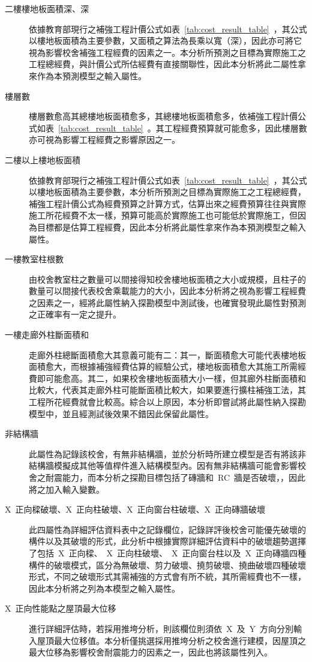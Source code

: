 \begin{description}
  \item[二樓樓地板面積深、深]
  依據教育部現行之補強工程計價公式如表~\ref{tab:cost_result_table}~，其公式以樓地板面積為主要參數，又面積之算法為長乘以寬（深），因此亦可將它視為影響校舍補強工程經費的因素之一。本分析所預測之目標為實際施工之工程總經費，與計價公式所估經費有直接關聯性，因此本分析將此二屬性拿來作為本預測模型之輸入屬性。
  \item[樓層數]
  樓層數愈高其總樓地板面積愈多，其總樓地板面積愈多，依補強工程計價公式如表~\ref{tab:cost_result_table}~。其工程經費預算就可能愈多，因此樓層數亦可視為影響工程經費之影響原因之一。
  \item[二樓以上樓地板面積]
  依據教育部現行之補強工程計價公式如表~\ref{tab:cost_result_table}~，其公式以樓地板面積為主要參數，本分析所預測之目標為實際施工之工程總經費，補強工程計價公式為經費預算之計算方式，估算出來之經費預算往往與實際施工所花經費不太一樣，預算可能高於實際施工也可能低於實際施工，但因為目標都是估算工程經費，因此本分析將此屬性拿來作為本預測模型之輸入屬性。
  \item[一樓教室柱根數]
  由校舍教室柱之數量可以間接得知校舍樓地板面積之大小或規模，且柱子的數量可以間接代表校舍乘載能力的大小，因此本分析將之視為影響工程經費之因素之一，經將此屬性納入探勘模型中測試後，也確實發現此屬性對預測之正確率有一定之提升。
  \item[一樓走廊外柱斷面積和]
  走廊外柱總斷面積愈大其意義可能有二：其一，斷面積愈大可能代表樓地板面積愈大，而根據補強經費估算的經驗公式，樓地板面積愈大其施工所需經費即可能愈高。其二，如果校舍樓地板面積大小一樣，但其廊外柱斷面積和比較大，代表其走廊外柱可能斷面積比較大，如果要進行擴柱補強工法，其工程所花經費就會比較高。綜合以上原因，本分析即嘗試將此屬性納入探勘模型中，並且經測試後效果不錯因此保留此屬性。
  \item[非結構牆]
  此屬性為記錄該校舍，有無非結構牆，並於分析時所建立模型是否有將該非結構牆模擬成其他等值桿件進入結構模型內。因有無非結構牆可能會影響校舍之耐震能力，而本分析之探勘目標包括了磚牆和~RC~牆是否破壞，，因此將之加入輸入變數。
  \item[X~正向樑破壞、X~正向柱破壞、X~正向窗台柱破壞、X~正向磚牆破壞]
  此四屬性為詳細評估資料表中之記錄欄位，記錄詳評後校舍可能優先破壞的構件以及其破壞的形式，此分析中根據實際詳細評估資料中的破壞趨勢選擇了包括~X~正向樑、~X~正向柱破壞、~X~正向窗台柱以及~X~正向磚牆四種構件的破壞模式，區分為無破壞、剪力破壞、撓剪破壞、撓曲破壞四種破壞形式，不同之破壞形式其需補強的方式會有所不統，其所需經費也不一樣，因此本分析將之列為本模型之輸入屬性。
  \item[X~正向性能點之屋頂最大位移]
  \cite{ncree08035}進行詳細評估時，若採用推垮分析，則該欄位則須依~X~及~Y~方向分別輸入屋頂最大位移值。本分析僅挑選採用推垮分析之校舍進行建模，因屋頂之最大位移為影響校舍耐震能力的因素之一，因此也將該屬性列入。

\end{description}
